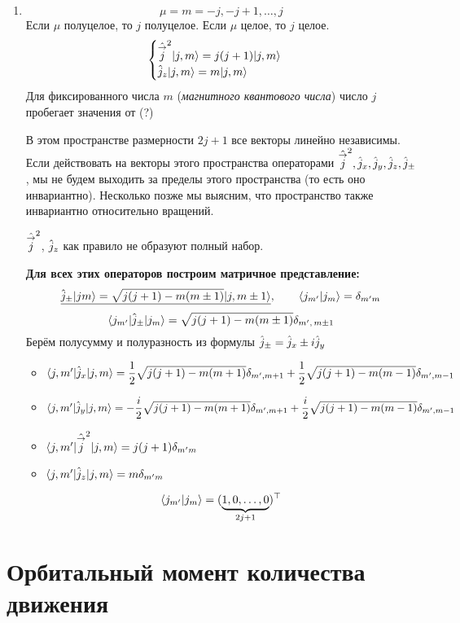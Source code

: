 \begin{enumerate}
  \item %
$$
    \mu = m = -j, -j+1, \ldots, j
$$
Если $\mu$ полуцелое, то $j$ полуцелое. Если $\mu$ целое, то $j$ целое.
$$
    \begin{cases}
        {\hat{\overset{\to}{j}}}^2 | j, m \rangle = j(j+1) | j, m \rangle\\
        \Hat j_z | j, m \rangle = m | j, m \rangle
    \end{cases}
$$
Для фиксированного числа $m$ (\emph{магнитного квантового числа}) число $j$ пробегает значения от (?)

\Rem В этом пространстве размерности $2j+1$ все векторы линейно независимы. Если действовать на векторы этого пространства операторами ${\hat{\overset{\to}{j}}}^2, \Hat j_x, \Hat j_y, \Hat j_z, {\hat j}_\pm$, мы не будем выходить за пределы этого пространства (то есть оно инвариантно). Несколько позже мы выясним, что пространство также инвариантно относительно вращений.

${\hat{\overset{\to}{j}}}^2$, $\Hat j_z$ как правило не образуют полный набор.

\textbf{Для всех этих операторов построим матричное представление:}
$$
\underline{    {\hat j}_\pm | jm \rangle = \sqrt{j(j+1) - m(m\pm 1)} | j, m \pm 1 \rangle}, \qquad \langle j_{m'} | j_m \rangle = \delta_{m'm}
$$
$$
    { \langle j_{m'} |{\hat j}_\pm| j_m \rangle } = \sqrt{j(j+1) - m(m\pm 1)} \delta_{m', \, m \pm 1}
$$
Берём полусумму и полуразность из формулы ${\hat j}_\pm = \Hat j_x \pm i \Hat j_y$
\begin{itemize}
  \item $
    { \langle j,m' |\Hat j_x| j,m \rangle } = \dfrac{1}{2} \sqrt{j(j+1) - m(m+1)} \delta_{m', m+1} +
    \dfrac12 \sqrt{j(j+1) - m(m-1)} \delta_{m', m-1}
$
  \item $
    { \langle j,m' |\Hat j_y| j,m \rangle } = -\dfrac{i}{2} \sqrt{j(j+1) - m(m+1)} \delta_{m', m+1} +
    \dfrac{i}{2} \sqrt{j(j+1) - m(m-1)} \delta_{m', m-1}
$
  \item $
    { \langle j,m' |{\hat{\overset{\to}{j}}}^2| j,m \rangle } = j(j+1) \delta_{m'm}
$
  \item $
    { \langle j,m' |\Hat j_z| j,m \rangle } = m \delta_{m'm}
$
\end{itemize}
$$
    \langle j_{m'} | j_m \rangle = (\underbrace{1, 0, \ldots, 0}_{2j+1})^\top
$$
\endgroup

\end{enumerate}

\section{Орбитальный момент количества движения}
